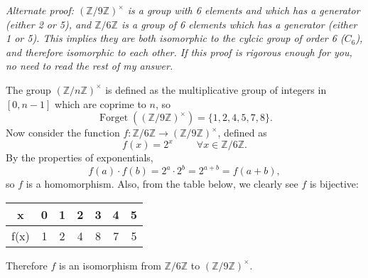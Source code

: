 \documentclass[12pt]{article}
\begin{document}
\bigskip
\noindent{}\bigskip

\textit{Alternate proof: $(\mathbb{Z}/9\mathbb{Z})^\times$ is a group with 6 elements and which has a generator (either 2 or 5), and $\mathbb{Z}/6\mathbb{Z}$ is a group of 6 elements which has a generator (either 1 or 5). This implies they are both isomorphic to the cylcic group of order 6 ($C_6$), and therefore isomorphic to each other. If this proof is rigorous enough for you, no need to read the rest of my answer.}
\bigskip
\par
The group $(\mathbb{Z}/n\mathbb{Z})^\times$ is defined as the multiplicative group of integers in $[0,n-1]$ which are coprime to $n$, so
\[ \operatorname{Forget}((\mathbb{Z}/9\mathbb{Z})^\times) = \{ 1,2,4,5,7,8 \}. \]
Now consider the function $f: \mathbb{Z}/6\mathbb{Z} \rightarrow (\mathbb{Z}/9\mathbb{Z})^\times$, defined as
\[ f(x) = 2^x \hspace{1cm} \forall x \in \mathbb{Z}/6\mathbb{Z}. \]
By the properties of exponentials,
\[ f(a) \cdot f(b) = 2^a \cdot 2^b = 2^{a+b} = f(a + b), \]
so $f$ is a homomorphism. Also, from the table below, we clearly see $f$ is bijective:
\begin{table}[h]
    \centering
    \begin{tabular}{|c||c|c|c|c|c|c|}
        \hline
        x & 0 & 1 & 2 & 3 & 4 & 5 \\
        \hline
        f(x) & 1 & 2 & 4 & 8 & 7 & 5 \\
        \hline
    \end{tabular}
\end{table}
\par
Therefore $f$ is an isomorphism from $\mathbb{Z}/6\mathbb{Z}$ to $(\mathbb{Z}/9\mathbb{Z})^\times$.

\bigskip
\noindent{}\bigskip
\end{document}
